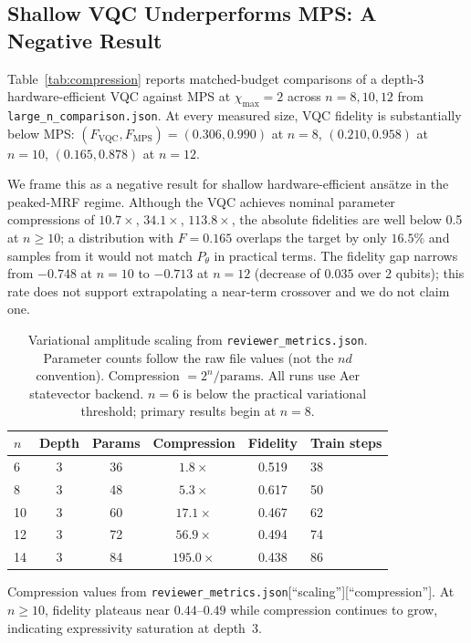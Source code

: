 \documentclass[conference,10pt]{IEEEtran}
\begin{document}
\subsection{Shallow VQC Underperforms MPS: A Negative Result}
\label{sec:vqc-neg}

Table~\ref{tab:compression} reports matched-budget comparisons of a depth-3 hardware-efficient VQC against MPS at $\chi_{\max}=2$ across $n=8,10,12$ from \texttt{large\_n\_comparison.json}. At every measured size, VQC fidelity is substantially below MPS: $(F_{\mathrm{VQC}},F_{\mathrm{MPS}})=(0.306,0.990)$ at $n=8$, $(0.210,0.958)$ at $n=10$, $(0.165,0.878)$ at $n=12$.

We frame this as a negative result for shallow hardware-efficient ans\"atze in the peaked-MRF regime. Although the VQC achieves nominal parameter compressions of $10.7\times$, $34.1\times$, $113.8\times$, the absolute fidelities are well below 0.5 at $n\ge10$; a distribution with $F=0.165$ overlaps the target by only $16.5\%$ and samples from it would not match $P_\theta$ in practical terms. The fidelity gap narrows from $-0.748$ at $n=10$ to $-0.713$ at $n=12$ (decrease of $0.035$ over 2 qubits); this rate does not support extrapolating a near-term crossover and we do not claim one.

\begin{table}[t]
\centering
\caption{Variational amplitude scaling from \texttt{reviewer\_metrics.json}. Parameter counts follow the raw file values (not the $nd$ convention). Compression $= 2^n / \text{params}$. All runs use Aer statevector backend. $n=6$ is below the practical variational threshold; primary results begin at $n=8$.}
\label{tab:variational}
\begin{tabular}{lccccl}
\toprule
\textbf{$n$} & \textbf{Depth} & \textbf{Params} & \textbf{Compression} & \textbf{Fidelity} & \textbf{Train steps} \\
\midrule
6  & 3 & 36 & $1.8\times$   & 0.519 & 38 \\
8  & 3 & 48 & $5.3\times$   & 0.617 & 50 \\
10 & 3 & 60 & $17.1\times$  & 0.467 & 62 \\
12 & 3 & 72 & $56.9\times$  & 0.494 & 74 \\
14 & 3 & 84 & $195.0\times$ & 0.438 & 86 \\
\bottomrule
\end{tabular}
\par\smallskip
{\footnotesize Compression values from \texttt{reviewer\_metrics.json}[``scaling''][``compression'']. At $n\geq10$, fidelity plateaus near $0.44$--$0.49$ while compression continues to grow, indicating expressivity saturation at depth~$3$.}
\end{table}
\end{document}
